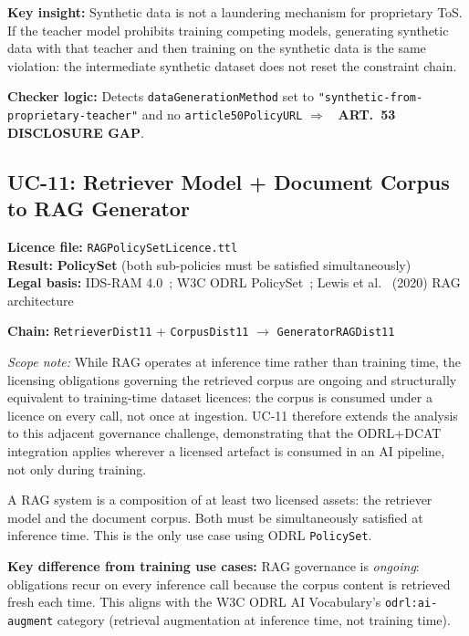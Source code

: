 \documentclass[12pt,a4paper]{article}
\newcommand{\violated}[1]{\textcolor{violation}{\textbf{\texttimes\ #1}}}
\newcommand{\policyset}{\textbf{PolicySet}}
\begin{document}
\textbf{Key insight:} Synthetic data is not a laundering mechanism for proprietary ToS. If the teacher model prohibits training competing models, generating synthetic data with that teacher and then training on the synthetic data is the same violation: the intermediate synthetic dataset does not reset the constraint chain.

\textbf{Checker logic:} Detects \texttt{dataGenerationMethod} set to \texttt{"synthetic\linebreak-from-proprietary-teacher"} and no \texttt{article50PolicyURL} $\Rightarrow$ \violated{ART.\ 53 DISCLOSURE GAP}.

\subsection{UC-11: Retriever Model + Document Corpus to RAG Generator}
\textbf{Licence file:} \texttt{RAGPolicySetLicence.ttl}\\[2pt]
\textbf{Result:} \policyset{} (both sub-policies must be satisfied simultaneously)\\[4pt]
\textbf{Legal basis:} IDS-RAM 4.0~\cite{idsram4}; W3C ODRL PolicySet~\cite{odrl22vocab}; Lewis et al.~\cite{lewis2020rag} (2020) RAG architecture

\textbf{Chain:} \texttt{RetrieverDist11} + \texttt{CorpusDist11} $\rightarrow$ \texttt{GeneratorRAGDist11}

\textit{Scope note:} While RAG operates at inference time rather than training time, the licensing obligations governing the retrieved corpus are ongoing and structurally equivalent to training-time dataset licences: the corpus is consumed under a licence on every call, not once at ingestion. UC-11 therefore extends the analysis to this adjacent governance challenge, demonstrating that the ODRL+DCAT integration applies wherever a licensed artefact is consumed in an AI pipeline, not only during training.

A RAG system is a composition of at least two licensed assets: the retriever model and the document corpus. Both must be simultaneously satisfied at inference time. This is the only use case using ODRL \texttt{PolicySet}.

\textbf{Key difference from training use cases:} RAG governance is \emph{ongoing}: obligations recur on every inference call because the corpus content is retrieved fresh each time. This aligns with the W3C ODRL AI Vocabulary's \texttt{odrl:ai-augment} category (retrieval augmentation at inference time, not training time).
\end{document}

